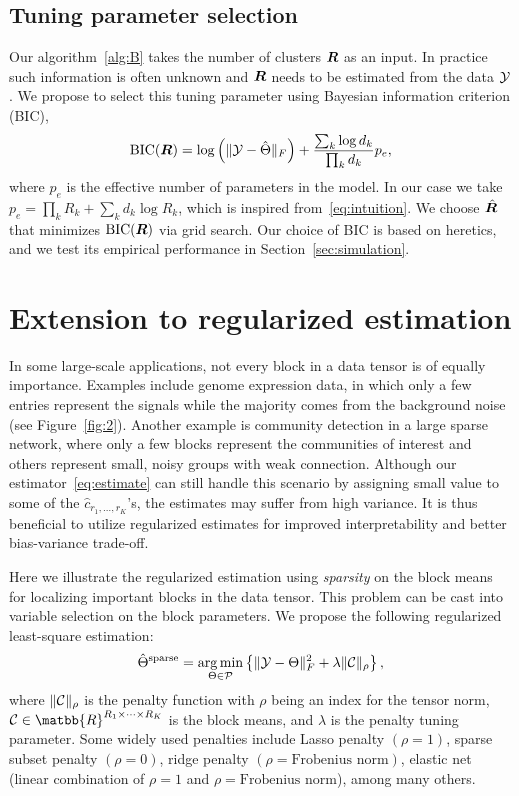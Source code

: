 \documentclass{article}
\begin{document}
\subsection{Tuning parameter selection}\label{sec:tuning}
Our algorithm~\ref{alg:B} takes the number of clusters $\bm{R}$ as an input. In practice such information is often unknown and $\bm{R}$ needs to be estimated from the data $\mathcal{Y}$. We propose to select this tuning parameter using Bayesian information criterion (BIC), 
\begin{equation}\label{eq:BIC}
\text{BIC}(\bm{R}) =  \log\left(\lVert\mathcal{Y}-\hat \Theta\rVert_F\right)+{ \sum_k \log d_k \over \prod_k d_k}p_e,
\end{equation}
where $p_e$ is the effective number of parameters in the model. In our case we take $p_e=\prod_k R_k+\sum_k d_k\log R_k$, which is inspired from~\eqref{eq:intuition}. We choose $\hat {\bm{R}}$ that minimizes $\text{BIC}(\bm{R})$ via grid search. Our choice of BIC is based on heretics, and we test its empirical performance in Section~\ref{sec:simulation}.  

\section{Extension to regularized estimation}
In some large-scale applications, not every block in a data tensor is of equally importance. Examples include genome expression data, in which only a few entries represent the signals while the majority comes from the background noise (see Figure~\ref{fig:2}). Another example is community detection in a large sparse network, where only a few blocks represent the communities of interest and others represent small, noisy groups with weak connection.  Although our estimator~\eqref{eq:estimate} can still handle this scenario by assigning small value to some of the $\hat c_{r_1,\ldots,r_K}$'s, the estimates may suffer from high variance. It is thus beneficial to utilize regularized estimates for improved interpretability and better bias-variance trade-off. 

Here we illustrate the regularized estimation using \emph{sparsity} on the block means for localizing important blocks in the data tensor. This problem can be cast into variable selection on the block parameters. We propose the following regularized least-square estimation:
\[
\hat \Theta^{\text{sparse}}=\operatorname*{arg\,min}_{\Theta\in \mathcal{P}}\left\{\lVert\mathcal{Y}-\Theta\rVert_F^2+\lambda \lVert\mathcal{C}\rVert_\rho
\right\},
\]
where $\lVert\mathcal{C}\rVert_\rho$ is the penalty function with $\rho$ being an index for the tensor norm, $\tC\in\matbb{R}^{R_1\times \cdots\times R_K}$ is the block means, and $\lambda$ is the penalty tuning parameter. Some widely used penalties include Lasso penalty $(\rho=1)$, sparse subset penalty $(\rho=0)$, ridge penalty $(\rho=\text{Frobenius norm})$, elastic net (linear combination of $\rho=1$ and $\rho=\text{Frobenius norm}$), among many others. 
\end{document}
